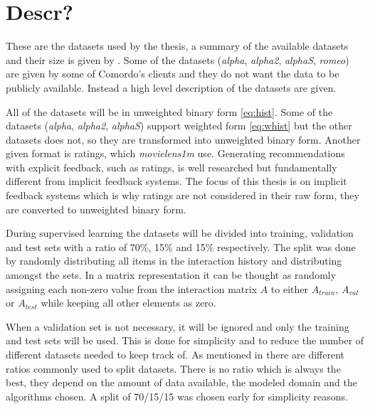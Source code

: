 
\section{Descr?}\label{sec:datasets}

These are the datasets used by the thesis, a summary of the available datasets and their size is given by . Some of the datasets (\textit{alpha}, \textit{alpha2}, \textit{alphaS}, \textit{romeo}) are given by some of Comordo's clients and they do not want the data to be publicly available. Instead a high level description of the datasets are given.

All of the datasets will be in unweighted binary form \eqref{eq:hist}. Some of the datasets (\textit{alpha}, \textit{alpha2}, \textit{alphaS}) support weighted form \eqref{eq:whist} but the other datasets does not, so they are transformed into unweighted binary form. Another given format is ratings, which \textit{movielens1m} use. Generating recommendations with explicit feedback, such as ratings, is well researched but fundamentally different from implicit feedback systems. The focus of this thesis is on implicit feedback systems which is why ratings are not considered in their raw form, they are converted to unweighted binary form.

During supervised learning the datasets will be divided into training, validation and test sets with a ratio of 70\%, 15\% and 15\% respectively. The split was done by randomly distributing all items in the interaction history and distributing amongst the sets. In a matrix representation it can be thought as randomly assigning each non-zero value from the interaction matrix $A$ to either $A_{train}$, $A_{val}$ or $A_{test}$ while keeping all other elements as zero.

When a validation set is not necessary, it will be ignored and only the training and test sets will be used. This is done for simplicity and to reduce the number of different datasets needed to keep track of.  As mentioned in  there are different ratios commonly used to split datasets. There is no ratio which is always the best, they depend on the amount of data available, the modeled domain and the algorithms chosen. A split of 70/15/15 was chosen early for simplicity reasons.

